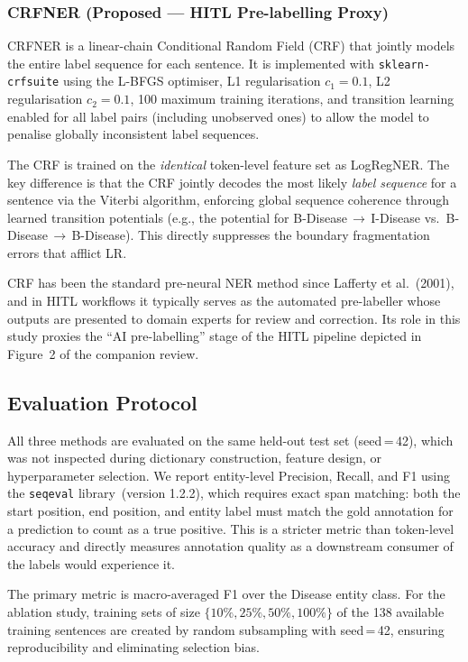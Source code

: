 \documentclass[sigconf,nonacm]{acmart}
\begin{document}
\subsubsection{CRFNER (Proposed --- HITL Pre-labelling Proxy)}

CRFNER is a linear-chain Conditional Random Field (CRF) that jointly
models the entire label sequence for each sentence. It is implemented
with \texttt{sklearn\allowbreak-crfsuite} using the L-BFGS optimiser,
L1 regularisation $c_1\!=\!0.1$, L2 regularisation $c_2\!=\!0.1$,
100 maximum training iterations, and transition learning enabled for
all label pairs (including unobserved ones) to allow the model to
penalise globally inconsistent label sequences.

The CRF is trained on the \emph{identical} token-level feature set as LogRegNER. The key difference is that the CRF jointly decodes the most likely \emph{label sequence} for a sentence via the Viterbi algorithm, enforcing global sequence coherence through learned transition potentials (e.g., the potential for B-Disease\,$\rightarrow$\,I-Disease vs.\ B-Disease\,$\rightarrow$\,B-Disease). This directly suppresses the boundary fragmentation errors that afflict LR.

CRF has been the standard pre-neural NER method since Lafferty et al.\ (2001), and in HITL workflows it typically serves as the automated pre-labeller whose outputs are presented to domain experts for review and correction. Its role in this study proxies the ``AI pre-labelling'' stage of the HITL pipeline depicted in Figure~2 of the companion review.

\subsection{Evaluation Protocol}

All three methods are evaluated on the same held-out test set (seed\,=\,42), which was not inspected during dictionary construction, feature design, or hyperparameter selection. We report entity-level Precision, Recall, and F1 using the \texttt{seqeval} library~(version 1.2.2), which requires exact span matching: both the start position, end position, and entity label must match the gold annotation for a prediction to count as a true positive. This is a stricter metric than token-level accuracy and directly measures annotation quality as a downstream consumer of the labels would experience it.

The primary metric is macro-averaged F1 over the Disease entity class. For the ablation study, training sets of size $\{10\%, 25\%, 50\%, 100\%\}$ of the 138 available training sentences are created by random subsampling with seed\,=\,42, ensuring reproducibility and eliminating selection bias.
\end{document}
